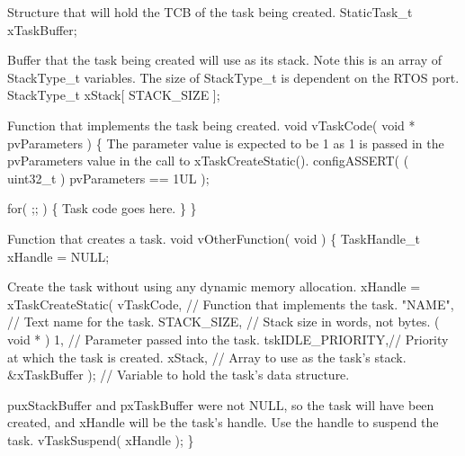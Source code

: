 \begin{DoxyPre}Structure that will hold the TCB of the task being created.
    StaticTask\_t xTaskBuffer;\end{DoxyPre}



\begin{DoxyPre}Buffer that the task being created will use as its stack.  Note this is
an array of StackType\_t variables.  The size of StackType\_t is dependent on
the RTOS port.
    StackType\_t xStack[ STACK\_SIZE ];\end{DoxyPre}



\begin{DoxyPre}Function that implements the task being created.
    void vTaskCode( void * pvParameters )
    \{
The parameter value is expected to be 1 as 1 is passed in the
pvParameters value in the call to xTaskCreateStatic().
        configASSERT( ( uint32\_t ) pvParameters == 1UL );\end{DoxyPre}



\begin{DoxyPre}        for( ;; )
        \{
Task code goes here.
        \}
    \}\end{DoxyPre}



\begin{DoxyPre}Function that creates a task.
    void vOtherFunction( void )
    \{
        TaskHandle\_t xHandle = NULL;\end{DoxyPre}



\begin{DoxyPre}Create the task without using any dynamic memory allocation.
        xHandle = xTaskCreateStatic(
                      vTaskCode,       // Function that implements the task.
                      "NAME",          // Text name for the task.
                      STACK\_SIZE,      // Stack size in words, not bytes.
                      ( void * ) 1,    // Parameter passed into the task.
                      tskIDLE\_PRIORITY,// Priority at which the task is created.
                      xStack,          // Array to use as the task's stack.
                      \&xTaskBuffer );  // Variable to hold the task's data structure.\end{DoxyPre}



\begin{DoxyPre}puxStackBuffer and pxTaskBuffer were not NULL, so the task will have
been created, and xHandle will be the task's handle.  Use the handle
to suspend the task.
        vTaskSuspend( xHandle );
    \}
   \end{DoxyPre}
 